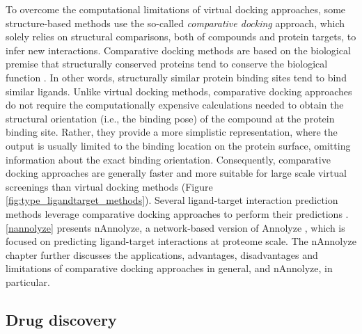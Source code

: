\documentclass[11pt, b5paper,twoside]{tesi_upf}
\begin{document}
\par To overcome the computational limitations of virtual docking approaches, some structure-based methods use the so-called \textit{comparative docking} approach, which solely relies on structural comparisons, both of compounds and protein targets, to infer new interactions. Comparative docking methods are based on the biological premise that structurally conserved proteins tend to  conserve the biological function \cite{Marti-Renom2007, Laskowski2005, Lee2007, Holm2010}. In other words, structurally similar protein binding sites tend to bind similar ligands. Unlike virtual docking methods, comparative docking approaches do not require the computationally expensive calculations needed to obtain the structural orientation (i.e., the binding pose) of the compound  at the protein binding site. Rather, they provide a more simplistic representation, where the output is usually limited to the binding location on the protein surface, omitting information about the exact binding orientation. Consequently, comparative docking approaches are generally faster and more suitable for large scale virtual screenings than virtual docking methods (Figure \ref{fig:type_ligandtarget_methods}). Several ligand-target interaction prediction methods leverage comparative docking approaches to perform their predictions \cite{Hoffmann2010, Wass2010, Capra2009, Kalinina2011, Marti-Renom2007}. \cref{nannolyze} presents nAnnolyze, a network-based version of Annolyze \cite{Marti-Renom2007}, which is focused on predicting ligand-target interactions at proteome scale. The nAnnolyze chapter further discusses the applications, advantages, disadvantages and limitations of comparative docking approaches in general, and nAnnolyze, in particular.


\subsection{Drug discovery}\label{drug_discovery}
\end{document}
